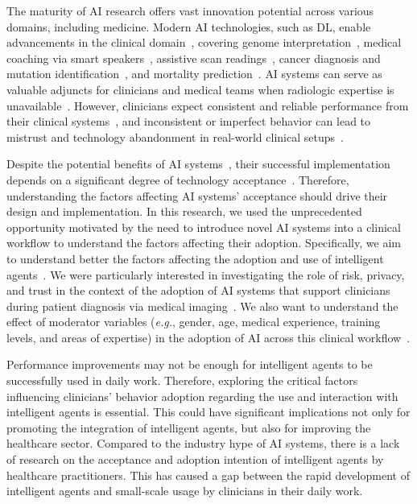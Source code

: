 The maturity of \ac{AI} research offers vast innovation potential across various domains, including medicine.
Modern AI technologies, such as \ac{DL}, enable advancements in the clinical domain~\cite{topol2019high}, covering genome interpretation~\cite{sundaram2018predicting}, medical coaching via smart speakers~\cite{CALISTO2022102922}, assistive scan readings~\cite{madani2018deep}, cancer diagnosis and mutation identification~\cite{coudray2018classification}, and mortality prediction~\cite{ahmad2018death}.
\ac{AI} systems can serve as valuable adjuncts for clinicians and medical teams when radiologic expertise is unavailable~\cite{doi:10.1148/radiol.2020201874, doi:10.1148/radiol.2020190283}.
However, clinicians expect consistent and reliable performance from their clinical systems~\cite{CALISTO2022102922, Kocielnik:2019:YAI:3290605.3300641}, and inconsistent or imperfect behavior can lead to mistrust and technology abandonment in real-world clinical setups~\cite{benrimoh2018aifred, CALISTO2021102607, CALISTO2022102285}.

Despite the potential benefits of AI systems~\cite{10.1145/3290605.3300233}, their successful implementation depends on a significant degree of technology acceptance~\cite{CALISTO2022102922}.
Therefore, understanding the factors affecting AI systems' acceptance should drive their design and implementation.
In this research, we used the unprecedented opportunity motivated by the need to introduce novel AI systems into a clinical workflow to understand the factors affecting their adoption.
Specifically, we aim to understand better the factors affecting the adoption and use of intelligent agents~\cite{JUNGMANN2021834}.
We were particularly interested in investigating the role of risk, privacy, and trust in the context of the adoption of AI systems that support clinicians during patient diagnosis via medical imaging~\cite{CALISTO2021102607, Kocielnik:2019:YAI:3290605.3300641}.
We also want to understand the effect of moderator variables ({\it e.g.}, gender, age, medical experience, training levels, and areas of expertise) in the adoption of AI across this clinical workflow~\cite{CALISTO2022102922}.

Performance improvements may not be enough for intelligent agents to be successfully used in daily work.
Therefore, exploring the critical factors influencing clinicians’ behavior adoption regarding the use and interaction with intelligent agents is essential.
This could have significant implications not only for promoting the integration of intelligent agents, but also for improving the healthcare sector.
Compared to the industry hype of AI systems, there is a lack of research on the acceptance and adoption intention of intelligent agents by healthcare practitioners.
This has caused a gap between the rapid development of intelligent agents and small-scale usage by clinicians in their daily work.

